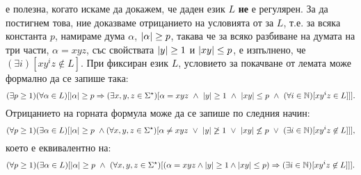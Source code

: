 \begin{framed}
   е полезна, когато искаме да докажем, че даден език $L$ {\bf не} е регулярен.
  За да постигнем това, ние доказваме отрицанието на условията от  за $L$, т.е.
  за всяка константа $p$, намираме дума $\alpha$, $\lvert{\alpha}\rvert\geq p$, такава че за всяко разбиване на думата на три части, $\alpha = xyz$,
  със свойствата $\lvert{y}\rvert \geq 1$ и $\lvert{xy}\rvert \leq p$, е изпълнено, че $(\exists i)[xy^iz \not\in L]$.
  При фиксиран език $L$, условието за покачване от лемата може формално да се запише така:
  {\scriptsize  
    \[(\exists p \geq 1)(\forall \alpha \in L)[\lvert{\alpha}\rvert \geq p \Rightarrow (\exists x,y,z\in\Sigma^\star)[\alpha = xyz\ \wedge\ \lvert{y}\rvert \geq 1\ \wedge\ \lvert{xy}\rvert \leq p\ \wedge\ (\forall i\in\mathbb{N})[xy^iz \in L]]].\]}
  Отрицанието на горната формула може да се запише по следния начин:
  {\scriptsize  \[(\forall p \geq 1)(\exists \alpha \in L)[\abs{\alpha} \geq p\ \wedge (\forall x,y,z\in\Sigma^\star)[\alpha \neq xyz\ \vee\ \abs{y} \not\geq 1\ \vee\ \abs{xy} \not\leq p\ \vee\ (\exists i\in\Nat)[xy^iz \not\in L]]],\]}
  което е еквивалентно на:
  {\scriptsize
    \[(\forall p \geq 1)(\exists \alpha \in L)[\lvert{\alpha}\rvert \geq p\ \wedge\ (\forall x,y,z\in\Sigma^\star)[(\alpha = xyz \wedge \lvert{y}\rvert \geq 1\wedge \lvert{xy}\rvert \leq p) \Rightarrow (\exists i\in\mathbb{N})[xy^iz \not\in L]]].\]}
\end{framed}

